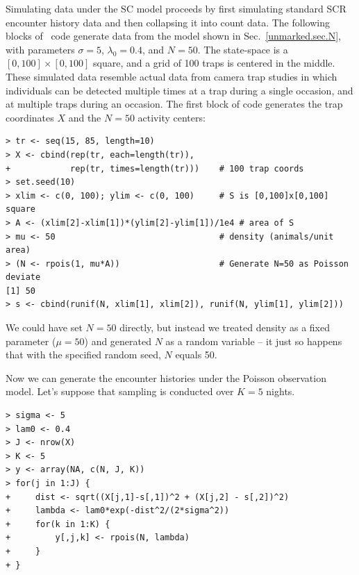 Simulating data under the SC model proceeds by first simulating
standard SCR encounter history data and then collapsing it into count
data. The following blocks of \R~code generate data from
the model shown in Sec.~\ref{unmarked.sec.N}, with parameters
$\sigma=5$, $\lambda_0=0.4$, and $N=50$. The state-space is a
$[0, 100] \times [0, 100]$ square, and a grid of 100 traps
is centered in the middle. These simulated data resemble actual
data from camera trap studies in which individuals can be detected multiple
times at a trap during a single occasion, and at multiple traps during
an occasion. The first block of code generates the trap coordinates
$X$ and the $N=50$ activity centers:
\begin{small}
\begin{verbatim}
> tr <- seq(15, 85, length=10)
> X <- cbind(rep(tr, each=length(tr)),
+            rep(tr, times=length(tr)))    # 100 trap coords
> set.seed(10)
> xlim <- c(0, 100); ylim <- c(0, 100)     # S is [0,100]x[0,100] square
> A <- (xlim[2]-xlim[1])*(ylim[2]-ylim[1])/1e4 # area of S
> mu <- 50                                 # density (animals/unit area)
> (N <- rpois(1, mu*A))                    # Generate N=50 as Poisson deviate
[1] 50
> s <- cbind(runif(N, xlim[1], xlim[2]), runif(N, ylim[1], ylim[2]))
\end{verbatim}
\end{small}
We could have set $N=50$ directly, but instead we treated density
as a fixed parameter ($\mu=50$) and generated $N$ as a random
variable -- it just so happens that with the specified random seed,
$N$ equals 50. %

Now we can generate the encounter histories under the
Poisson observation model. Let's suppose that sampling is conducted
over $K=5$ nights.
\begin{verbatim}
> sigma <- 5
> lam0 <- 0.4
> J <- nrow(X)
> K <- 5
> y <- array(NA, c(N, J, K))
> for(j in 1:J) {
+     dist <- sqrt((X[j,1]-s[,1])^2 + (X[j,2] - s[,2])^2)
+     lambda <- lam0*exp(-dist^2/(2*sigma^2))
+     for(k in 1:K) {
+         y[,j,k] <- rpois(N, lambda)
+     }
+ }
\end{verbatim}

